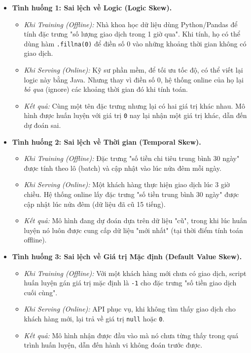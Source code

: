 \documentclass[11pt]{article}
\begin{document}
\begin{itemize}
	\begin{itemize}
	    \item \textbf{Tình huống 1: Sai lệch về Logic (Logic Skew).}
	    \begin{itemize}
	        \item \textit{Khi Training (Offline):} Nhà khoa học dữ liệu dùng Python/Pandas để tính đặc trưng "số lượng giao dịch trong 1 giờ qua". Khi tính, họ có thể dùng hàm \texttt{.fillna(0)} để điền số 0 vào những khoảng thời gian không có giao dịch.
	        \item \textit{Khi Serving (Online):} Kỹ sư phần mềm, để tối ưu tốc độ, có thể viết lại logic này bằng Java. Nhưng thay vì điền số 0, hệ thống online của họ lại \textit{bỏ qua} (ignore) các khoảng thời gian đó khi tính toán.
	        \item \textit{Kết quả:} Cùng một tên đặc trưng nhưng lại có hai giá trị khác nhau. Mô hình được huấn luyện với giá trị \texttt{0} nay lại nhận một giá trị khác, dẫn đến dự đoán sai.
	    \end{itemize}
	
	    \item \textbf{Tình huống 2: Sai lệch về Thời gian (Temporal Skew).}
	    \begin{itemize}
	        \item \textit{Khi Training (Offline):} Đặc trưng "số tiền chi tiêu trung bình 30 ngày" được tính theo lô (batch) và cập nhật vào lúc nửa đêm mỗi ngày.
	        \item \textit{Khi Serving (Online):} Một khách hàng thực hiện giao dịch lúc 3 giờ chiều. Hệ thống online lấy đặc trưng "số tiền trung bình 30 ngày" được cập nhật lúc nửa đêm (dữ liệu đã cũ 15 tiếng).
	        \item \textit{Kết quả:} Mô hình đang dự đoán dựa trên dữ liệu "cũ", trong khi lúc huấn luyện nó luôn được cung cấp dữ liệu "mới nhất" (tại thời điểm tính toán offline).
	    \end{itemize}
	
	    \item \textbf{Tình huống 3: Sai lệch về Giá trị Mặc định (Default Value Skew).}
	    \begin{itemize}
	        \item \textit{Khi Training (Offline):} Với một khách hàng mới chưa có giao dịch, script huấn luyện gán giá trị mặc định là \texttt{-1} cho đặc trưng "số tiền giao dịch cuối cùng".
	        \item \textit{Khi Serving (Online):} API phục vụ, khi không tìm thấy giao dịch cho khách hàng mới, lại trả về giá trị \texttt{null} hoặc \texttt{0}.
	        \item \textit{Kết quả:} Mô hình nhận được đầu vào mà nó chưa từng thấy trong quá trình huấn luyện, dẫn đến hành vi không đoán trước được.
	    \end{itemize}
	\end{itemize}
	

\end{itemize}
\end{document}
